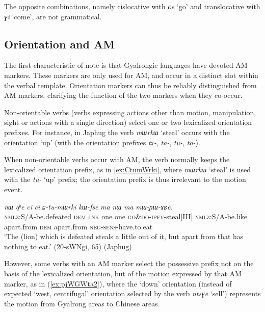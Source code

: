 \documentclass[oneside,a4paper,11pt]{article}
\newcommand{\ipa}[1]{{\phon\textit{#1}}}
\newcommand{\forme}[1]{\textit{\phon#1}}
\newcommand{\japhug}[2]{\textit{\phon#1} `#2'}
\newcommand{\rouge}[1]{{\color{red}#1}}
\begin{document}
The opposite combinations, namely cislocative with \japhug{ɕe}{go} and translocative with \japhug{ɣi}{come}, are not grammatical. 



\subsection{Orientation and AM} \label{sec:orientation.japhug}
The first characteristic of note is that Gyalrongic languages have devoted AM markers.  These markers are only used for AM, and occur in a distinct slot within the verbal template.  Orientation markers can thus be reliably distinguished from AM markers, clarifying the function of the two markers when they co-occur.


Non-orientable verbs (verbs expressing actions other than motion, manipulation, sight or actions with a single direction) select one or two lexicalized orientation prefixes. For instance, in Japhug the verb \japhug{mɯrkɯ}{steal} occurs with the orientation `up' (with the orientation prefixes \forme{tɤ-}, \forme{ta-}, \forme{tu-}, \forme{to-}). 

When non-orientable verbs occur with AM, the verb normally keeps the lexicalized orientation prefix, as in \ref{ex:CtumWrki}, where \japhug{mɯrkɯ}{steal} is used with the \forme{tu-} `up' prefix; the orientation prefix is thus irrelevant to the motion event. 

\begin{exe}
\ex \label{ex:CtumWrki}
 \gll \ipa{kɯ-nŋo}	\ipa{nɯ}	\ipa{qʰe}	\ipa{ci}	\ipa{ci}	\ipa{\rouge{ɕ}-tu-mɯrki}	\ipa{kɯ-fse}	\ipa{ma}	\ipa{nɯ}	\ipa{ma}	\ipa{mɯ-ɲɯ-ɤʁe.} \\
\textsc{nmlz}:S/A-be.defeated \textsc{dem} \textsc{lnk} one one \rouge{\textsc{go\&do}}-\textsc{ipfv}-steal[III] \textsc{nmlz}:S/A-be.like apart.from \textsc{dem} apart.from \textsc{neg}-\textsc{sens}-have.to.eat \\
\glt `The (lion) which is defeated steals a little out of it, but apart from that has nothing to eat.' (20-sWNgi, 65) (Japhug)
\end{exe}

However, some verbs with an AM marker select the possessive prefix not on the basis of the lexicalized orientation, but of the motion expressed by that AM marker, as in (\ref{ex:pjWGWta2}), where the `down' orientation (instead of expected `west, centrifugal' orientation selected by the verb \forme{ntsɣe} `sell') represents the motion from Gyalrong areas to Chinese areas.
\end{document}
